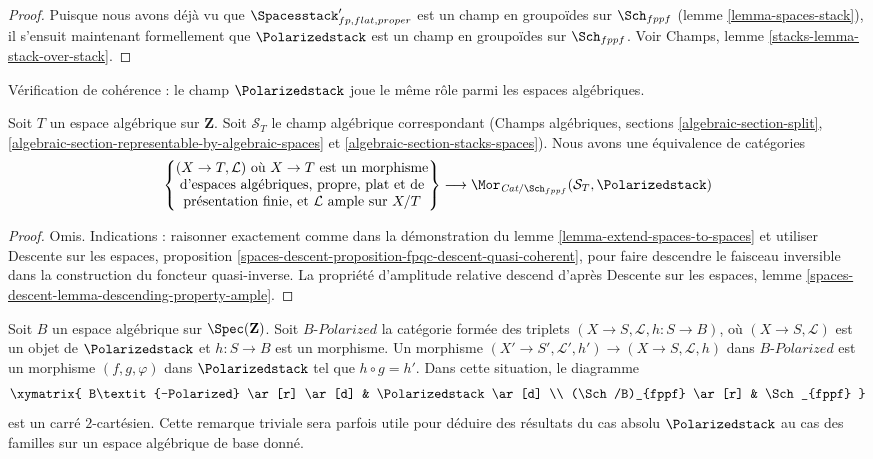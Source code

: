 \begin{proof}
\medskip\noindent
Puisque nous avons déjà vu que $\Spacesstack'_{fp, flat, proper}$ est un champ
en groupoïdes sur $\Sch_{fppf}$ (lemme \ref{lemma-spaces-stack}), il s'ensuit
maintenant formellement que $\Polarizedstack$ est un champ en groupoïdes sur
$\Sch_{fppf}$. Voir Champs, lemme \ref{stacks-lemma-stack-over-stack}.
\end{proof}

\noindent
Vérification de cohérence : le champ $\Polarizedstack$ joue le même rôle parmi
les espaces algébriques.

\begin{lemma}
\label{lemma-extend-polarized-to-spaces}
Soit $T$ un espace algébrique sur $\mathbf{Z}$. Soit $\mathcal{S}_T$
le champ algébrique correspondant (Champs algébriques, sections
\ref{algebraic-section-split},
\ref{algebraic-section-representable-by-algebraic-spaces} et
\ref{algebraic-section-stacks-spaces}).
Nous avons une équivalence de catégories
$$
\left\{
\begin{matrix}
(X \to T, \mathcal{L})\text{ où }X \to T\text{ est un morphisme}\\
\text{d'espaces algébriques, propre, plat et de}\\
\text{présentation finie, et }\mathcal{L}\text{ ample sur }X/T
\end{matrix}
\right\}
\longrightarrow
\Mor_{\textit{Cat}/\Sch_{fppf}}(\mathcal{S}_T, \Polarizedstack)
$$
\end{lemma}

\begin{proof}
Omis. Indications : raisonner exactement comme dans la démonstration du
lemme \ref{lemma-extend-spaces-to-spaces} et utiliser
Descente sur les espaces, proposition
\ref{spaces-descent-proposition-fpqc-descent-quasi-coherent}, pour faire
descendre le faisceau inversible dans la construction du foncteur
quasi-inverse. La propriété d'amplitude relative descend d'après
Descente sur les espaces, lemme
\ref{spaces-descent-lemma-descending-property-ample}.
\end{proof}

\begin{remark}
\label{remark-polarized-base-change}
Soit $B$ un espace algébrique sur $\Spec(\mathbf{Z})$.
Soit $B\textit{-Polarized}$ la catégorie formée des triplets
$(X \to S, \mathcal{L}, h : S \to B)$, où
$(X \to S, \mathcal{L})$ est un objet de $\Polarizedstack$ et
$h : S \to B$ est un morphisme.
Un morphisme
$(X' \to S', \mathcal{L}', h') \to (X \to S, \mathcal{L}, h)$ dans
$B\textit{-Polarized}$ est un morphisme $(f, g, \varphi)$ dans
$\Polarizedstack$ tel que $h \circ g = h'$.
Dans cette situation, le diagramme
$$
\xymatrix{
B\textit{-Polarized} \ar[r] \ar[d] & \Polarizedstack \ar[d] \\
(\Sch/B)_{fppf} \ar[r] & \Sch_{fppf}
}
$$
est un carré $2$-cartésien. Cette remarque triviale sera parfois utile
pour déduire des résultats du cas absolu $\Polarizedstack$ au cas des familles
sur un espace algébrique de base donné.
\end{remark}

